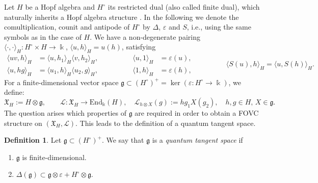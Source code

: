 \documentclass{article}
\theoremstyle{definition}
\newtheorem{definition}[thm]{Definition}
\newcommand{\Chi}{{\mathfrak{X}}}
\newcommand{\fg}{{\mathfrak{g}}}
\begin{document}
	Let $H$ be a Hopf algebra and  $H^\circ$ its restricted dual 
	(also called finite dual), which naturally inherits a Hopf algebra structure \cite[Theorem 9.1.3]{mont}. 
	In the following we denote the comultiplication, counit and antipode of $H^\circ$ by $\Delta$, $\varepsilon$ and $S$, i.e., using the same symbols as in the case of $H$.
	We have a non-degenerate pairing
	$\langle \cdot , \cdot \rangle_H:H^\circ \times H \to \Bbbk$, $ \langle u , h \rangle_H=u(h)$,
	satisfying
	\begin{equation*}
		\begin{split}
			\langle uv , h \rangle_H&=\langle u , h_1 \rangle_H\langle v , h_2 \rangle_H,\\
			\langle u , hg \rangle_H&=\langle u_1 , h \rangle_H\langle u_2 , g \rangle_H,
		\end{split}\qquad\qquad
		\begin{split}
			\langle u , 1 \rangle_H&=\varepsilon(u),\\
			\langle 1 , h \rangle_H&=\varepsilon(h),
		\end{split}\qquad\qquad
		\begin{split}
			\langle S(u),h\rangle_H=\langle u,S(h)\rangle_H.
		\end{split}
	\end{equation*}
	For a finite-dimensional vector space $\fg \subset (H^\circ)^+=\ker(\varepsilon\colon H^\circ\to\Bbbk)$, we define:
	\begin{equation}\label{def:XH}
		\Chi_H:=H \otimes \fg, \qquad \mathscr{L}\colon\Chi_H \to  \mathrm{End}_\Bbbk(H),
		\quad \mathscr{L}_{h \otimes X}(g):=hg_1X(g_2), \quad h,g \in H, \, X \in \fg. 
	\end{equation}
	The question arises which properties of $\mathfrak{g}$ are required in order to obtain a FOVC structure on $(\mathfrak{X}_H,\mathscr{L})$. This leads to the definition of a quantum tangent space.
	
	\begin{definition}\label{def:QTS}
		Let $\fg \subset  (H^\circ)^+$. We say that $\fg$ is a \textit{quantum tangent space} if
		\begin{enumerate}
			\item[i.)] $\fg$ is finite-dimensional.
			
			\item[ii.)] $\Delta(\fg) \subset \fg \otimes\varepsilon+H^\circ \otimes \fg$.
		\end{enumerate}
	\end{definition}
	
\end{document}
